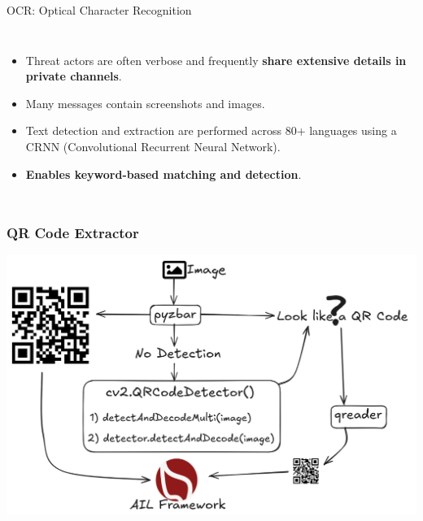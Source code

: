 \documentclass[10pt,aspectratio=169, colorlinks=true, linkcolor=circlBlue]{beamer}
\begin{document}
\begin{frame}[fragile]{OCR: Optical Character Recognition}
\begin{columns}[T,onlytextwidth]
\begin{itemize}
                \item Threat actors are often verbose and frequently {\bf share extensive details in private channels}.
                \item Many messages contain screenshots and images.
                \item Text detection and extraction are performed across 80+ languages using a CRNN (Convolutional Recurrent Neural Network).
                \item {\bf Enables keyword-based matching and detection}.
            \end{itemize}
    \end{columns}
\end{frame}

\begin{frame}
    \frametitle{QR Code Extractor}
    \begin{center}
        \includegraphics[scale=0.27]{images/qr_decoder.png}
    \end{center}
\end{frame}
\end{document}
